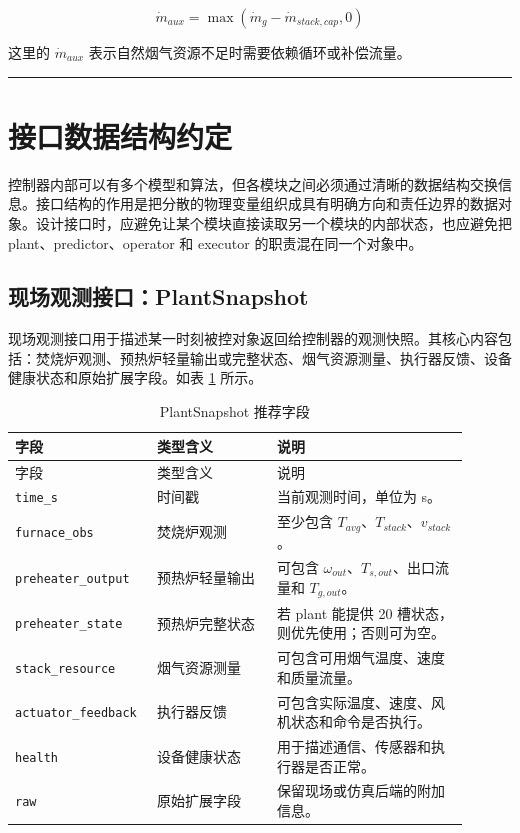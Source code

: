 \documentclass[UTF8,openany,zihao=-4,oneside]{ctexbook}
\newcommand{\manualdivider}{\par\vspace{0.6em}\noindent\textcolor{FGLine}{\rule{\linewidth}{0.7pt}}\vspace{0.6em}\par}
\begin{document}
\[
\dot m_{aux}=\max\left(\dot m_g-\dot m_{stack,cap},0\right)
\]

这里的 \(\dot m_{aux}\) 表示自然烟气资源不足时需要依赖循环或补偿流量。

\manualdivider

\section{接口数据结构约定}\label{sec:data-structures}

控制器内部可以有多个模型和算法，但各模块之间必须通过清晰的数据结构交换信息。接口结构的作用是把分散的物理变量组织成具有明确方向和责任边界的数据对象。设计接口时，应避免让某个模块直接读取另一个模块的内部状态，也应避免把 plant、predictor、operator 和 executor 的职责混在同一个对象中。

\subsection{现场观测接口：PlantSnapshot}\label{subsec:plantsnapshot}

现场观测接口用于描述某一时刻被控对象返回给控制器的观测快照。其核心内容包括：焚烧炉观测、预热炉轻量输出或完整状态、烟气资源测量、执行器反馈、设备健康状态和原始扩展字段。如表 \ref{tab:plantsnapshot} 所示。

\begin{longtable}{@{}p{0.25\linewidth}p{0.25\linewidth}p{0.40\linewidth}@{}}
\caption{PlantSnapshot 推荐字段}\label{tab:plantsnapshot}\\
\toprule
字段 & 类型含义 & 说明 \\
\midrule
\endfirsthead
\toprule
字段 & 类型含义 & 说明 \\
\midrule
\endhead
\texttt{time\_s} & 时间戳 & 当前观测时间，单位为 s。 \\
\texttt{furnace\_obs} & 焚烧炉观测 & 至少包含 \(T_{avg}\)、\(T_{stack}\)、\(v_{stack}\)。 \\
\texttt{preheater\_output} & 预热炉轻量输出 & 可包含 \(\omega_{out}\)、\(T_{s,out}\)、出口流量和 \(T_{g,out}\)。 \\
\texttt{preheater\_state} & 预热炉完整状态 & 若 plant 能提供 20 槽状态，则优先使用；否则可为空。 \\
\texttt{stack\_resource} & 烟气资源测量 & 可包含可用烟气温度、速度和质量流量。 \\
\texttt{actuator\_feedback} & 执行器反馈 & 可包含实际温度、速度、风机状态和命令是否执行。 \\
\texttt{health} & 设备健康状态 & 用于描述通信、传感器和执行器是否正常。 \\
\texttt{raw} & 原始扩展字段 & 保留现场或仿真后端的附加信息。 \\
\bottomrule
\end{longtable}
\end{document}
